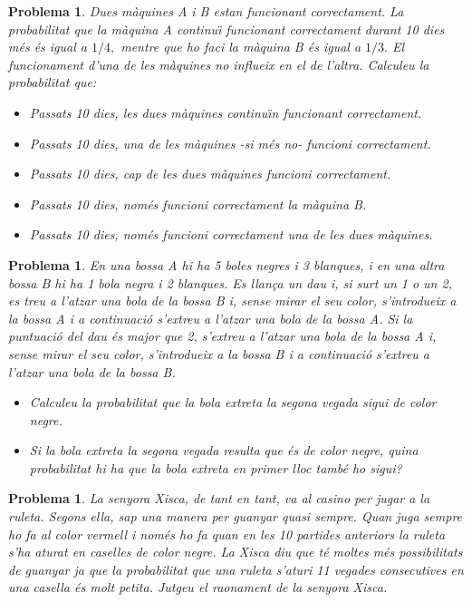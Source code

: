 \documentclass[11pt]{article}
\newcounter{prbcont}
\newtheorem{problema}[prbcont]{Problema}
\begin{document}
\begin{problema}
Dues m\`aquines A i B estan funcionant correctament. La probabilitat que la m\`aquina A continu\"{\i} funcionant correctament durant 10 dies m\'es \'es igual a $1/4,$ mentre que ho faci la m\`aquina B \'es igual a $1/3.$ El funcionament d'una de les m\`aquines no influeix en el de l'altra. Calculeu la probabilitat que:
\begin{itemize}
\item [(a)] Passats 10 dies, les dues m\`aquines continu\"{\i}n funcionant correctament. %
\item [(b)] Passats 10 dies, una de les m\`aquines -si m\'es no- funcioni correctament. %
\item [(c)] Passats 10 dies, cap de les dues m\`aquines funcioni correctament. %
\item [(d)] Passats 10 dies, nom\'es funcioni correctament la m\`aquina B. %
\item [(e)] Passats 10 dies, nom\'es funcioni correctament una de les dues m\`aquines. %
\end{itemize}
\end{problema}

\begin{problema}
En una bossa A hi ha 5 boles negres i 3 blanques, i en una altra bossa B hi ha 1 bola negra i 2 blanques. Es llan\c{c}a un dau i, si surt un 1 o un 2, es treu a l'atzar una bola de la bossa B i, sense mirar el seu color, s'introdueix a la bossa A i a continuaci\'o s'extreu a l'atzar una bola de la bossa A. Si la puntuaci\'o del dau \'es major que 2, s'extreu a l'atzar una bola de la bossa A i, sense mirar el seu color, s'introdueix a la bossa B i a continuaci\'o s'extreu a l'atzar una bola de la bossa B.
\begin{itemize}
\item [(a)] Calculeu la probabilitat que la bola extreta la segona vegada sigui de color negre. %
\item [(b)] Si la bola extreta la segona vegada resulta que \'es de color negre, quina probabilitat hi ha que la bola extreta en primer lloc tamb\'e ho sigui? %
\end{itemize}
\end{problema}

\begin{problema}
La senyora Xisca, de tant en tant, va al casino per jugar a la ruleta. Segons ella, sap una manera per guanyar quasi sempre. Quan juga sempre ho fa al color vermell i nom\'es ho fa quan en les 10 partides anteriors la ruleta s'ha aturat en caselles de color negre. La Xisca diu que t\'e moltes m\'es possibilitats de guanyar ja que la probabilitat que una ruleta s'aturi 11 vegades consecutives en una casella \'es molt petita. Jutgeu el raonament de la senyora Xisca.
\end{problema}
\end{document}
